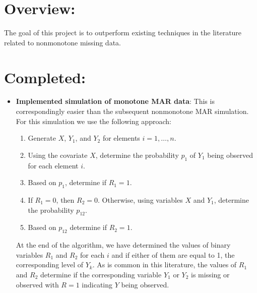 \documentclass[12pt]{article}
\begin{document}

\section*{Overview:}

The goal of this project is to outperform existing techniques in the literature
related to nonmonotone missing data.

\section*{Completed:}

\begin{itemize}
  \item \textbf{Implemented simulation of monotone MAR data}: This is 
  correspondingly easier
  than the subsequent nonmonotone MAR simulation. For this simulation we use the 
  following approach:
  \begin{enumerate}
      \item Generate $X$, $Y_1$, and $Y_2$ for elements $i = 1, \dots, n$.
      \item Using the covariate $X$, determine the probability $p_1$ of $Y_1$
      being observed for each element $i$.
      \item Based on $p_1$, determine if $R_1 = 1$.
      \item If $R_1 = 0$, then $R_2 = 0$. Otherwise, using variables $X$ and $Y_1$,
      determine the probability $p_{12}$.
      \item Based on $p_{12}$ determine if $R_2 = 1$.
  \end{enumerate}
  At the end of the algorithm, we have determined the values of binary variables 
  $R_1$ and $R_2$ for each $i$ and if either of them are equal to 1, the corresponding
  level of $Y_{k}$. As is common in this literature, the values of $R_1$ and $R_2$
  determine if the corresponding variable $Y_1$ or $Y_2$ is missing or observed
  with $R = 1$ indicating $Y$ being observed.
  

\end{itemize}
\end{document}
